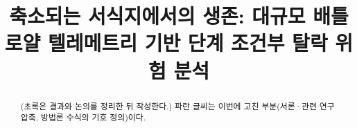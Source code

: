 \documentclass[conference]{IEEEtran}
\newcommand{\rev}[1]{{\color{revblue}#1}}
\begin{document}
\title{축소되는 서식지에서의 생존: 대규모 배틀로얄 텔레메트리 기반 단계 조건부 탈락 위험 분석}
\author{}
\maketitle

\begin{abstract}
(초록은 결과와 논의를 정리한 뒤 작성한다.) \rev{파란 글씨는 이번에 고친 부분(서론·관련 연구 압축, 방법론 수식의 기호 정의)이다.}
\end{abstract}







\end{document}
